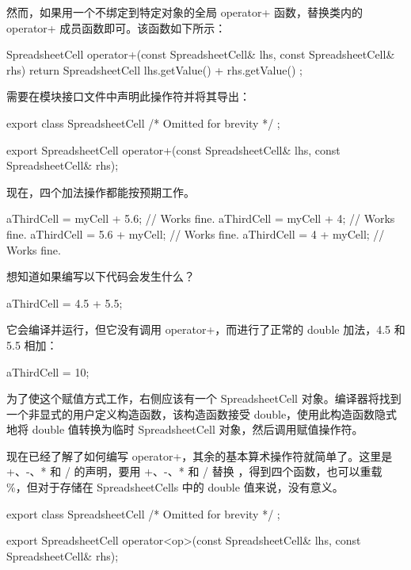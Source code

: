 然而，如果用一个不绑定到特定对象的全局 operator+ 函数，替换类内的 operator+ 成员函数即可。该函数如下所示：

\begin{cpp}
SpreadsheetCell operator+(const SpreadsheetCell& lhs,
    const SpreadsheetCell& rhs)
{
    return SpreadsheetCell { lhs.getValue() + rhs.getValue() };
}
\end{cpp}

需要在模块接口文件中声明此操作符并将其导出：

\begin{cpp}
export class SpreadsheetCell { /* Omitted for brevity */ };

export SpreadsheetCell operator+(const SpreadsheetCell& lhs,
    const SpreadsheetCell& rhs);
\end{cpp}

现在，四个加法操作都能按预期工作。

\begin{cpp}
aThirdCell = myCell + 5.6; // Works fine.
aThirdCell = myCell + 4; // Works fine.
aThirdCell = 5.6 + myCell; // Works fine.
aThirdCell = 4 + myCell; // Works fine.
\end{cpp}

想知道如果编写以下代码会发生什么？

\begin{cpp}
aThirdCell = 4.5 + 5.5;
\end{cpp}

它会编译并运行，但它没有调用 operator+，而进行了正常的 double 加法，4.5 和 5.5 相加：

\begin{cpp}
aThirdCell = 10;
\end{cpp}

为了使这个赋值方式工作，右侧应该有一个 SpreadsheetCell 对象。编译器将找到一个非显式的用户定义构造函数，该构造函数接受 double，使用此构造函数隐式地将 double 值转换为临时 SpreadsheetCell 对象，然后调用赋值操作符。


现在已经了解了如何编写 operator+，其余的基本算术操作符就简单了。这里是 +、-、* 和 / 的声明，要用 +、-、* 和 / 替换 ，得到四个函数，也可以重载 \%，但对于存储在 SpreadsheetCells 中的 double 值来说，没有意义。

\begin{cpp}
export class SpreadsheetCell { /* Omitted for brevity */ };

export SpreadsheetCell operator<op>(const SpreadsheetCell& lhs,
    const SpreadsheetCell& rhs);
\end{cpp}

